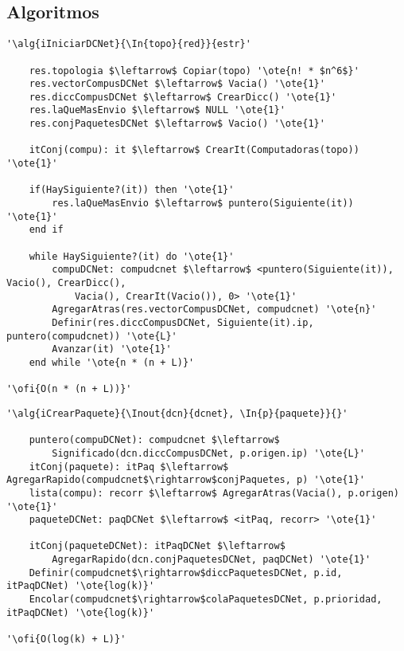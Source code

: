 \subsection{Algoritmos}

\lstset{style=alg}

\begin{lstlisting}[mathescape]
'\alg{iIniciarDCNet}{\In{topo}{red}}{estr}'

    res.topologia $\leftarrow$ Copiar(topo) '\ote{n! * $n^6$}'
    res.vectorCompusDCNet $\leftarrow$ Vacia() '\ote{1}'
    res.diccCompusDCNet $\leftarrow$ CrearDicc() '\ote{1}'
    res.laQueMasEnvio $\leftarrow$ NULL '\ote{1}'
    res.conjPaquetesDCNet $\leftarrow$ Vacio() '\ote{1}'

    itConj(compu): it $\leftarrow$ CrearIt(Computadoras(topo)) '\ote{1}'

    if(HaySiguiente?(it)) then '\ote{1}'
    	res.laQueMasEnvio $\leftarrow$ puntero(Siguiente(it)) '\ote{1}'
    end if

    while HaySiguiente?(it) do '\ote{1}'
    	compuDCNet: compudcnet $\leftarrow$ <puntero(Siguiente(it)), Vacio(), CrearDicc(),
    		Vacia(), CrearIt(Vacio()), 0> '\ote{1}'
    	AgregarAtras(res.vectorCompusDCNet, compudcnet) '\ote{n}'
    	Definir(res.diccCompusDCNet, Siguiente(it).ip, puntero(compudcnet)) '\ote{L}'
    	Avanzar(it) '\ote{1}'
    end while '\ote{n * (n + L)}'

'\ofi{O(n * (n + L))}'
\end{lstlisting}

\begin{lstlisting}[mathescape]
'\alg{iCrearPaquete}{\Inout{dcn}{dcnet}, \In{p}{paquete}}{}'

	puntero(compuDCNet): compudcnet $\leftarrow$
		Significado(dcn.diccCompusDCNet, p.origen.ip) '\ote{L}'
	itConj(paquete): itPaq $\leftarrow$ AgregarRapido(compudcnet$\rightarrow$conjPaquetes, p) '\ote{1}'
	lista(compu): recorr $\leftarrow$ AgregarAtras(Vacia(), p.origen) '\ote{1}'
	paqueteDCNet: paqDCNet $\leftarrow$ <itPaq, recorr> '\ote{1}'

	itConj(paqueteDCNet): itPaqDCNet $\leftarrow$
		AgregarRapido(dcn.conjPaquetesDCNet, paqDCNet) '\ote{1}'
	Definir(compudcnet$\rightarrow$diccPaquetesDCNet, p.id, itPaqDCNet) '\ote{log(k)}'
	Encolar(compudcnet$\rightarrow$colaPaquetesDCNet, p.prioridad, itPaqDCNet) '\ote{log(k)}'

'\ofi{O(log(k) + L)}'
\end{lstlisting}

